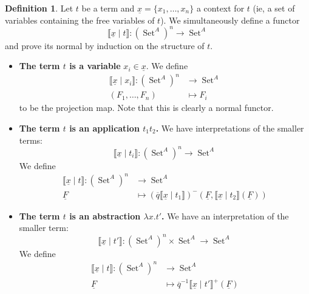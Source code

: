\documentclass[12pt]{article}
\theoremstyle{plain}
\theoremstyle{definition}
\newtheorem{defn}[thm]{Definition} %
\newcommand{\lto}{\longrightarrow}
\DeclareMathOperator{\set}{Set}
\begin{document}
\begin{defn}
    Let $t$ be a term and $\underline{x} = \{x_1, \ldots, x_n\}$ a context for $t$ (ie, a set of variables containing the free variables of $t$). We simultaneously define a functor
    \begin{equation}
        \llbracket \underline{x} \mid t \rrbracket: (\set^A)^n \lto \set^A
    \end{equation}
    and prove its normal by induction on the structure of $t$.
    \begin{itemize}
        \item \textbf{The term $t$ is a variable} $x_i \in \underline{x}$. We define
        \begin{align*}
            \llbracket \underline{x} \mid x_i \rrbracket : (\set^A)^n &\lto \set^A\\
            (F_1, \ldots, F_n) &\longmapsto F_i
        \end{align*}
        to be the projection map. Note that this is clearly a normal functor.
        \item \textbf{The term $t$ is an application $t_1 t_2$.} We have interpretations of the smaller terms:
        \begin{equation}
            \llbracket \underline{x} \mid t_i \rrbracket: (\set^A)^n \lto \set^A
        \end{equation}
        We define
        \begin{align*}
        \llbracket \underline{x} \mid t \rrbracket: (\set^A)^n &\lto \set^A\\
        \underline{F} &\longmapsto (\overline{q}\llbracket \underline{x} \mid t_1 \rrbracket)^-(\underline{F}, \llbracket \underline{x} \mid t_2\rrbracket(\underline{F}))
        \end{align*}
        \item \textbf{The term $t$ is an abstraction $\lambda x. t'$.} We have an interpretation of the smaller term:
        \begin{equation}
            \llbracket \underline{x} \mid t' \rrbracket: (\set^A)^n \times \set^A \lto \set^A
        \end{equation}
        We define
        \begin{align*}
            \llbracket \underline{x} \mid t\rrbracket: (\set^A)^n &\lto \set^A\\
            \underline{F} &\longmapsto \overline{q}^{-1}\llbracket \underline{x} \mid t' \rrbracket^+(\underline{F})
        \end{align*}
    \end{itemize}
\end{defn}
\end{document}
